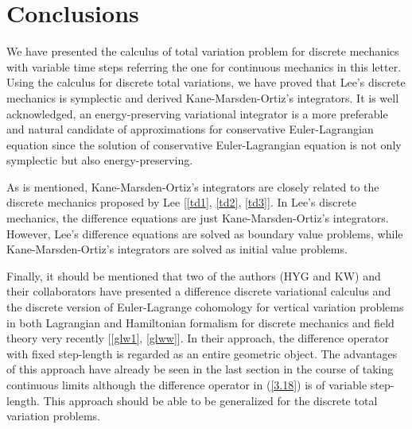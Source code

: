 \documentclass[a4paper,a4paper]{article}
\def\sect#1{\section{#1}\setcounter{equation}{0}}
\begin{document}
\sect{Conclusions}

We have presented the calculus of total variation problem
for discrete mechanics with variable time steps referring the one
for continuous mechanics
 in this letter.
Using the calculus for discrete total  variations, we have proved
that Lee's discrete mechanics is symplectic and derived
Kane-Marsden-Ortiz's integrators. It is well acknowledged, an
energy-preserving variational integrator is a more preferable and
natural candidate of approximations for conservative
Euler-Lagrangian equation since the solution of conservative
Euler-Lagrangian equation is not only symplectic but also
energy-preserving.

As is mentioned, Kane-Marsden-Ortiz's integrators are closely
related to the discrete mechanics proposed by Lee [\ref{td1},
\ref{td2}, \ref{td3}]. %
In Lee's discrete mechanics, the difference equations are just
Kane-Marsden-Ortiz's integrators.
 However, Lee's difference equations are solved as
boundary value problems, while Kane-Marsden-Ortiz's integrators
are solved as initial value problems.

Finally, it should be mentioned that two of the authors (HYG and
KW) and their collaborators have presented a difference discrete
variational calculus and the discrete version of Euler-Lagrange
cohomology  for vertical variation problems in both Lagrangian and
Hamiltonian formalism for discrete mechanics and field theory very
recently [\ref{glw1}, \ref{glww}]. In their approach, the
difference operator with fixed step-length  is regarded as an
entire geometric object. The advantages of this approach have
already be seen in the last section in the course of taking
continuous limits although the difference operator \coordHE{} in
(\ref{3.18}) is of variable step-length. This approach should be
able to be generalized for the  discrete total variation problems.
\end{document}

